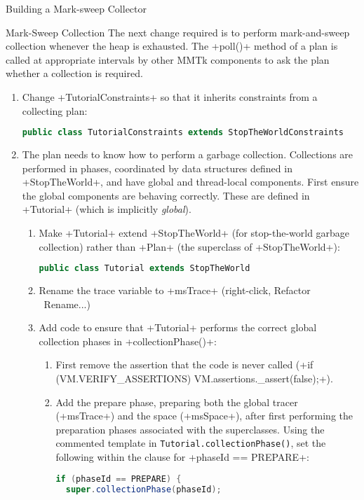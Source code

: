 \begin{chapter}{Building a Mark-sweep Collector}
\begin{section}{Mark-Sweep Collection}
The next change required is to perform mark-and-sweep collection whenever the heap is exhausted. The \spverb+poll()+ method of a plan is called at appropriate intervals by other MMTk components to ask the plan whether a collection is required.
\begin{enumerate}
  \item Change \spverb+TutorialConstraints+ so that it inherits constraints from a collecting plan:
    \begin{lstlisting}[language=Java]
public class TutorialConstraints extends StopTheWorldConstraints
    \end{lstlisting}
  \item The plan needs to know how to perform a garbage collection. Collections are performed in phases, coordinated by data structures defined in \spverb+StopTheWorld+, and have global and thread-local components. First ensure the global components are behaving correctly. These are defined in \spverb+Tutorial+ (which is implicitly \textit{global}).
    \begin{enumerate}
      \item Make \spverb+Tutorial+ extend \spverb+StopTheWorld+ (for stop-the-world garbage collection) rather than \spverb+Plan+ (the superclass of \spverb+StopTheWorld+):
        \begin{lstlisting}[language=Java]
public class Tutorial extends StopTheWorld
        \end{lstlisting}
       \item Rename the trace variable to \spverb+msTrace+ (right-click, Refactor \textrightarrow\ Rename...)
       \item Add code to ensure that \spverb+Tutorial+ performs the correct global collection phases in \spverb+collectionPhase()+:
         \begin{enumerate}
           \item First remove the assertion that the code is never called (\spverb+if (VM.VERIFY_ASSERTIONS) VM.assertions._assert(false);+).
           \item Add the prepare phase, preparing both the global tracer (\spverb+msTrace+) and the space (\spverb+msSpace+), after first performing the preparation phases associated with the superclasses. Using the commented template in \texttt{Tu\-to\-rial.col\-lec\-tion\-Pha\-se()}, set the following within the clause for \spverb+phaseId == PREPARE+:
             \begin{lstlisting}[language=Java]
if (phaseId == PREPARE) {
  super.collectionPhase(phaseId);

\end{lstlisting}
\end{enumerate}
\end{enumerate}
\end{enumerate}
\end{section}
\end{chapter}
